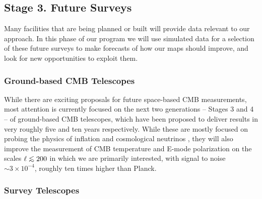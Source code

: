 \documentclass[psfig,11pt]{article}
\def\lo{\mathrel{\raise.3ex\hbox{$<$}\mkern-14mu\lower0.6ex\hbox{$\sim$}}}
\begin{document}
\subsection{Stage 3. Future Surveys}

Many facilities that are being planned or built will provide data relevant to our approach. In this phase of our program we will use simulated data for a selection of these future surveys to make forecasts of how our maps should improve, and look for new opportunities to exploit them.

\subsubsection{Ground-based CMB Telescopes}

While there are exciting proposals for future space-based CMB measurements, most attention is currently focused on the next two generations -- Stages 3 and 4 -- of ground-based CMB telescopes, which have been proposed to deliver results in very roughly five and ten years respectively. While these are mostly focused on probing the physics of inflation and cosmological neutrinos \cite{CMBS4Inflation,CMBS4Neutrinos}, they will also improve the measurement of CMB temperature and E-mode polarization on the scales $\ell\lo200$ in which we are primarily interested, with signal to noise $\sim3\times10^{-4}$, roughly ten times higher than Planck.

\subsubsection{Survey Telescopes}
\end{document}
